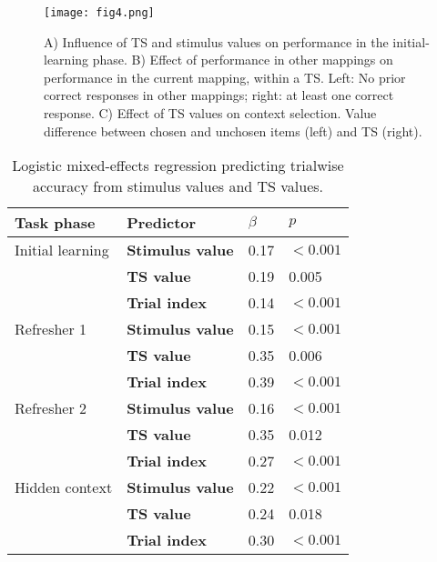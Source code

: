 \documentclass[10pt, letterpaper]{article}
\begin{document}
\begin{figure}[ht]
\begin{center}
\texttt{[image: fig4.png]}
\end{center}
\caption{
    A) Influence of TS and stimulus values on performance in the initial-learning phase.
    B) Effect of performance in other mappings on performance in the current mapping, within a TS. Left: No prior correct responses in other mappings; right: at least one correct response.
    C) Effect of TS values on context selection. Value difference between chosen and unchosen items (left) and TS (right).}
\label{figure:learning values}
\end{figure}

\begin{table}[!ht]
\begin{center} 
\caption{Logistic mixed-effects regression predicting trialwise accuracy from stimulus values and TS values.} 
\label{table:accuracy} 
\vskip 0.1in
\small{
\begin{tabular}{llll} 
\hline
Task phase          &   Predictor               &   $\beta$ &   $p$ \\
\hline
Initial learning    &   {\bf Stimulus value}    &   0.17    &   $<0.001$ \\
                    &   {\bf TS value}          &   0.19    &   0.005  \\
                    &   {\bf Trial index}       &   0.14    &   $<0.001$ \\
Refresher 1         &   {\bf Stimulus value}    &   0.15    &   $<0.001$ \\
                    &   {\bf TS value}          &   0.35    &   0.006  \\
                    &   {\bf Trial index}       &   0.39    &   $<0.001$ \\
Refresher 2         &   {\bf Stimulus value}    &   0.16    &   $<0.001$ \\
                    &   {\bf TS value}          &   0.35    &   0.012  \\
                    &   {\bf Trial index}       &   0.27    &   $<0.001$ \\
Hidden context      &   {\bf Stimulus value}    &   0.22    &   $<0.001$ \\
                    &   {\bf TS value}          &   0.24    &   0.018  \\
                    &   {\bf Trial index}       &   0.30    &   $<0.001$ \\
\hline
\end{tabular}
}
\end{center} 
\end{table}
\end{document}
